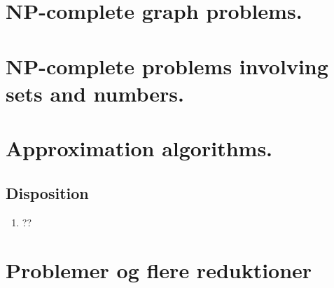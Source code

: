 \documentclass{article}
\begin{document}
\section{NP-complete graph problems.}


\newpage

\section{NP-complete problems involving sets and numbers.}


\newpage

\section{Approximation algorithms.}
\subsection{Disposition}
\begin{enumerate}
    \item ??
\end{enumerate}
\newpage
\section{Problemer og flere reduktioner}

\end{document}
